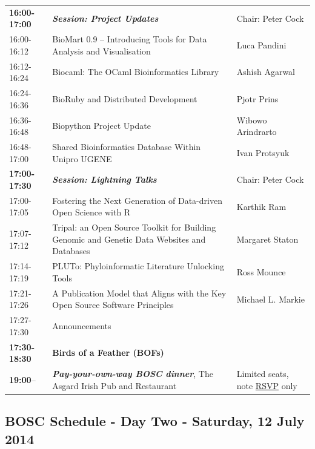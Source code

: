 \documentclass[10pt,oneside]{article}
\begin{document}
\begin{center}
\begin{tabular}{|p{2.0cm}|p{10cm}|p{3.3cm}|}
\hline
\textbf{16:00-17:00} & \textbf{\textit{Session: Project Updates}} & Chair: Peter Cock\\
16:00-16:12 & BioMart 0.9 -- Introducing Tools for Data Analysis and Visualisation & Luca Pandini\\
16:12-16:24 & Biocaml: The OCaml Bioinformatics Library & Ashish Agarwal\\
16:24-16:36 & BioRuby and Distributed Development & Pjotr Prins\\
16:36-16:48 & Biopython Project Update & Wibowo Arindrarto\\
16:48-17:00 & Shared Bioinformatics Database Within Unipro UGENE & Ivan Protsyuk\\
\hline
\textbf{17:00-17:30} & \textbf{\textit{Session: Lightning Talks}} & Chair: Peter Cock\\
17:00-17:05 & Fostering the Next Generation of Data-driven Open Science with R & Karthik Ram\\
17:07-17:12 & Tripal: an Open Source Toolkit for Building Genomic and Genetic Data Websites and Databases & Margaret Staton\\
17:14-17:19 & PLUTo: Phyloinformatic Literature Unlocking Tools & Ross Mounce\\
17:21-17:26 & A Publication Model that Aligns with the Key Open Source Software Principles & Michael L. Markie\\
17:27-17:30 & Announcements & \\
\hline
\textbf{17:30-18:30} & \textbf{Birds of a Feather (BOFs)} & \\
\hline
\textbf{19:00}-- & \textbf{\textit{Pay-your-own-way BOSC dinner}}, The Asgard Irish Pub and Restaurant & Limited seats, note \href{http://bit.ly/BOSC2014-dinner}{RSVP} only \\
\hline
\end{tabular}
\end{center}

\newpage

\subsection*{BOSC Schedule - Day Two - Saturday, 12 July 2014}
\end{document}
